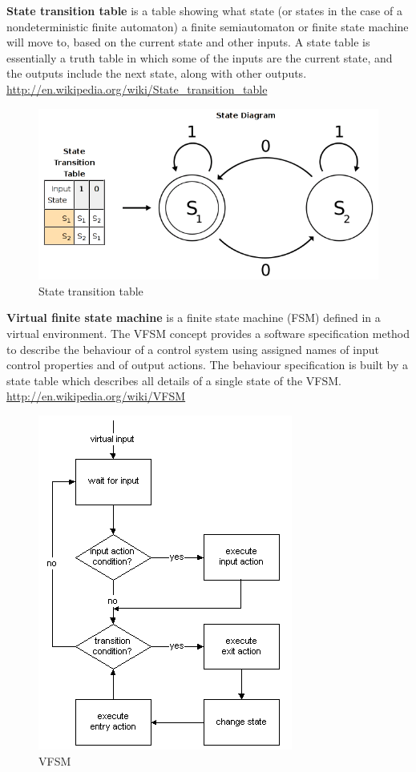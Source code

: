 \textbf{State transition table} is a table showing what state (or states in the case of a nondeterministic finite automaton) a finite semiautomaton or finite state machine will move to, based on the current state and other inputs. A state table is essentially a truth table in which some of the inputs are the current state, and the outputs include the next state, along with other outputs.\\
\url{http://en.wikipedia.org/wiki/State\_transition\_table}\\

\begin{figure}[htbp]
    \centering
    \includegraphics[scale=0.6]{images/transition_table.png}
    \caption[State transition table]{State transition table}
\end{figure}

\textbf{Virtual finite state machine} is a finite state machine (FSM) defined in a virtual environment. The VFSM concept provides a software specification method to describe the behaviour of a control system using assigned names of input control properties and of output actions. The behaviour specification is built by a state table which describes all details of a single state of the VFSM.\\
\url{http://en.wikipedia.org/wiki/VFSM}\\

\begin{figure}[htbp]
    \centering
    \includegraphics[scale=0.8]{images/vfsm.png}
    \caption[VFSM]{VFSM}
\end{figure}

